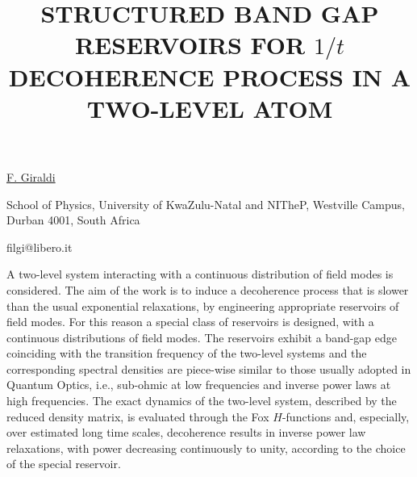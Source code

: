 \title{STRUCTURED BAND GAP RESERVOIRS FOR $1/t$ DECOHERENCE PROCESS IN A TWO-LEVEL ATOM}

\underline{F. Giraldi}

{\normalsize{\vspace{-4mm}
School of Physics, University of KwaZulu-Natal and NITheP, Westville Campus, Durban 4001, South Africa

\email filgi@libero.it}}

A two-level system interacting with a continuous distribution of
field modes is considered.
The aim of the work is to induce a decoherence process that is slower than the
usual exponential relaxations, by engineering appropriate reservoirs of field
modes. For this reason a special class of reservoirs is designed, with a
continuous distributions of field modes. The reservoirs exhibit a band-gap edge
coinciding with the transition frequency of the two-level systems and the
corresponding spectral densities are piece-wise similar to those usually
adopted in Quantum Optics, i.e., sub-ohmic at low frequencies and inverse power
laws at high frequencies. The exact dynamics of the two-level system, described
by the reduced density matrix, is evaluated through the Fox $H$-functions and,
especially, over estimated long time scales, decoherence results in inverse
power law relaxations, with power decreasing continuously to unity, according
to the choice of the special reservoir.

\vspace{\baselineskip} 